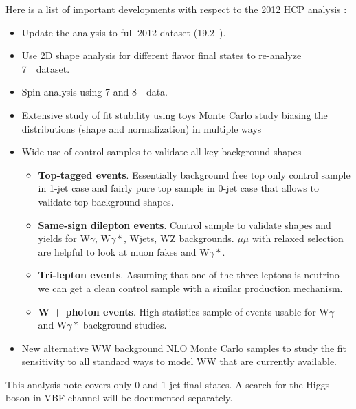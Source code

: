Here is a list of important developments with respect to the 2012 HCP
analysis \cite{HWWHCP2012}:
\begin{itemize}
\item 
Update the analysis to full 2012 dataset (19.2~\ifb).
\item 
Use 2D shape analysis for different flavor final states to re-analyze
7~\TeV\ dataset.
\item
Spin analysis using 7 and 8~\TeV\ data.
\item 
Extensive study of fit stubility using toys Monte Carlo study biasing
the distributions (shape and normalization) in multiple ways
\item
Wide use of control samples to validate all key background shapes
\begin{itemize}
  \item {\bf Top-tagged events}. Essentially background free top only
  control sample in 1-jet case and fairly pure top sample in 0-jet
  case that allows to validate top background shapes.  

  \item {\bf Same-sign dilepton events}. Control sample to validate
  shapes and yields for W$\gamma$, W$\gamma*$, Wjets, WZ
  backgrounds. $\mu\mu$ with relaxed selection are helpful to look at
  muon fakes and W$\gamma*$.
  
  \item {\bf Tri-lepton events}. Assuming that one of the three
  leptons is neutrino we can get a clean control sample with a similar
  production mechanism.

  \item {\bf W + photon events}. High statistics sample of events
  usable for W$\gamma$ and W$\gamma*$ background studies.
\end{itemize}
\item 
New alternative WW background NLO Monte Carlo samples to study the fit
sensitivity to all standard ways to model WW that are currently available.
\end{itemize}

This analysis note covers only 0 and 1 jet final states. A search for
the Higgs boson in VBF channel will be documented separately.
